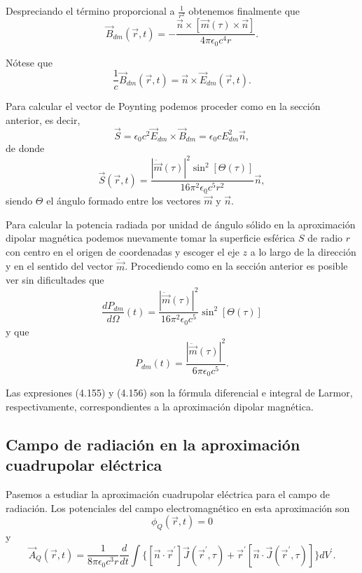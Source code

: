 \documentclass[12pt,a4paper]{book}
\begin{document}
Despreciando el término proporcional a $\frac{1}{r^2}$ obtenemos finalmente que
\begin{equation}
\vec{B}_{dm}(\vec{r}, t) = -\frac{\vec{n} \times [\vec{m}(\tau) \times \vec{n}]}{4\pi\epsilon_0 c^4 r}.
\end{equation}

Nótese que
\begin{equation}
\frac{1}{c}\vec{B}_{dm}(\vec{r}, t) = \vec{n} \times \vec{E}_{dm}(\vec{r}, t).
\end{equation}

Para calcular el vector de Poynting podemos proceder como en la sección anterior, es decir,
\begin{equation}
\vec{S} = \epsilon_0 c^2\vec{E}_{dm} \times \vec{B}_{dm} = \epsilon_0 cE_{dm}^2\vec{n},
\end{equation}
de donde
\begin{equation}
\vec{S}(\vec{r}, t) = \frac{|\ddot{\vec{m}}(\tau)|^2 \sin^2 [\Theta(\tau)]}{16\pi^2 \epsilon_0 c^5 r^2}\vec{n},
\end{equation}
siendo $\Theta$ el ángulo formado entre los vectores $\ddot{\vec{m}}$ y $\vec{n}$.

Para calcular la potencia radiada por unidad de ángulo sólido en la aproximación dipolar magnética podemos nuevamente tomar la superficie esférica $S$ de radio $r$ con centro en el origen de coordenadas y escoger el eje $z$ a lo largo de la dirección y en el sentido del vector $\ddot{\vec{m}}$. Procediendo como en la sección anterior es posible ver sin dificultades que
\begin{equation}
\frac{dP_{dm}}{d\Omega}(t) = \frac{|\ddot{\vec{m}}(\tau)|^2}{16\pi^2 \epsilon_0 c^5}\sin^2 [\Theta(\tau)]
\end{equation}
y que
\begin{equation}
P_{dm}(t) = \frac{|\ddot{\vec{m}}(\tau)|^2}{6\pi\epsilon_0 c^5}.
\end{equation}

Las expresiones (4.155) y (4.156) son la fórmula diferencial e integral de Larmor, respectivamente, correspondientes a la aproximación dipolar magnética.

\subsection{Campo de radiación en la aproximación cuadrupolar eléctrica}

Pasemos a estudiar la aproximación cuadrupolar eléctrica para el campo de radiación. Los potenciales del campo electromagnético en esta aproximación son
\begin{equation}
\phi_Q(\vec{r}, t) = 0
\end{equation}
y
\begin{equation}
\vec{A}_Q(\vec{r}, t) = \frac{1}{8\pi\epsilon_0 c^3 r}\frac{d}{dt}\int\{[\vec{n} \cdot \vec{r}^{\prime}]\vec{J}(\vec{r}^{\prime}, \tau) + \vec{r}^{\prime}[\vec{n} \cdot \vec{J}(\vec{r}^{\prime}, \tau)]\}dV^{\prime}.
\end{equation}
\end{document}
